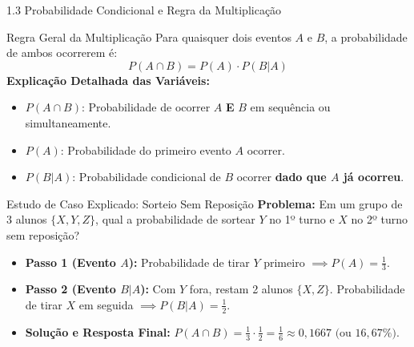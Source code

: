 \documentclass[10pt, aspectratio=169]{beamer}
\begin{document}
\begin{frame}{1.3 Probabilidade Condicional e Regra da Multiplicação}
	\vspace{-0.2cm}
    \begin{block}{Regra Geral da Multiplicação}
        Para quaisquer dois eventos $A$ e $B$, a probabilidade de ambos ocorrerem é:
        \vspace{-0.2cm}
        \[ P(A \cap B) = P(A) \cdot P(B|A) \]
        \textbf{Explicação Detalhada das Variáveis:}
        \begin{itemize}
            \item $P(A \cap B)$: Probabilidade de ocorrer $A$ \textbf{E} $B$ em sequência ou simultaneamente.
            \item $P(A)$: Probabilidade do primeiro evento $A$ ocorrer.
            \item $P(B|A)$: Probabilidade condicional de $B$ ocorrer \textbf{dado que $A$ já ocorreu}.
        \end{itemize}
    \end{block}

    \begin{exampleblock}{Estudo de Caso Explicado: Sorteio Sem Reposição}
        \textbf{Problema:} Em um grupo de 3 alunos $\{X, Y, Z\}$, qual a probabilidade de sortear $Y$ no 1º turno e $X$ no 2º turno sem reposição?
        \begin{itemize}
            \item \textbf{Passo 1 (Evento $A$):} Probabilidade de tirar $Y$ primeiro $\implies P(A) = \frac{1}{3}$.
            \item \textbf{Passo 2 (Evento $B|A$):} Com $Y$ fora, restam 2 alunos $\{X, Z\}$. Probabilidade de tirar $X$ em seguida $\implies P(B|A) = \frac{1}{2}$.
            \item \textbf{Solução e Resposta Final:} $P(A \cap B) = \frac{1}{3} \cdot \frac{1}{2} = \frac{1}{6} \approx 0{,}1667 \text{ (ou } 16{,}67\%\text{)}$.
        \end{itemize}
    \end{exampleblock}
\end{frame}
\end{document}
